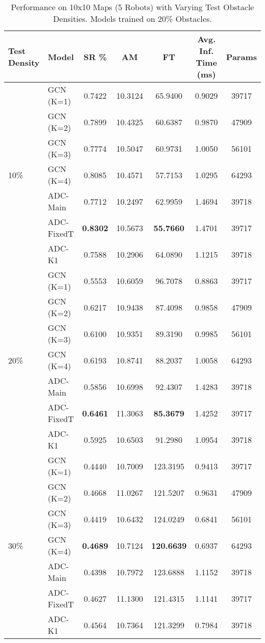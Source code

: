 \begin{table}[htbp]
    \centering
    \caption{Performance on 10x10 Maps (5 Robots) with Varying Test Obstacle Densities. Models trained on 20\% Obstacles.}
    \label{tab:density_perf_20D_train}
    \scriptsize %
    \begin{tabular}{llccccc}
        \toprule
        Test Density & Model & SR \% & AM & FT & Avg. Inf. Time (ms) & Params \\
        \midrule
        \multirow{7}{*}{10\%}
        & GCN (K=1) & 0.7422 & 10.3124 & 65.9400 & 0.9029 & 39717 \\
        & GCN (K=2) & 0.7899 & 10.4325 & 60.6387 & 0.9870 & 47909 \\
        & GCN (K=3) & 0.7774 & 10.5047 & 60.9731 & 1.0050 & 56101 \\
        & GCN (K=4) & 0.8085 & 10.4571 & 57.7153 & 1.0295 & 64293 \\
        & ADC-Main & 0.7712 & 10.2497 & 62.9959 & 1.4694 & 39718 \\
        & ADC-FixedT & \textbf{0.8302} & 10.5673 & \textbf{55.7660} & 1.4701 & 39717 \\
        & ADC-K1 & 0.7588 & 10.2906 & 64.0890 & 1.1215 & 39718 \\
        \midrule
        \multirow{7}{*}{20\%}
        & GCN (K=1) & 0.5553 & 10.6059 & 96.7078 & 0.8863 & 39717 \\
        & GCN (K=2) & 0.6217 & 10.9438 & 87.4098 & 0.9858 & 47909 \\
        & GCN (K=3) & 0.6100 & 10.9351 & 89.3190 & 0.9985 & 56101 \\
        & GCN (K=4) & 0.6193 & 10.8741 & 88.2037 & 1.0058 & 64293 \\
        & ADC-Main & 0.5856 & 10.6998 & 92.4307 & 1.4283 & 39718 \\
        & ADC-FixedT & \textbf{0.6461} & 11.3063 & \textbf{85.3679} & 1.4252 & 39717 \\ %
        & ADC-K1 & 0.5925 & 10.6503 & 91.2980 & 1.0954 & 39718 \\
        \midrule
        \multirow{7}{*}{30\%}
        & GCN (K=1) & 0.4440 & 10.7009 & 123.3195 & 0.9413 & 39717 \\
        & GCN (K=2) & 0.4668 & 11.0267 & 121.5207 & 0.9631 & 47909 \\
        & GCN (K=3) & 0.4419 & 10.6432 & 124.0249 & 0.6841 & 56101 \\
        & GCN (K=4) & \textbf{0.4689} & 10.7124 & \textbf{120.6639} & 0.6937 & 64293 \\
        & ADC-Main & 0.4398 & 10.7972 & 123.6888 & 1.1152 & 39718 \\
        & ADC-FixedT & 0.4627 & 11.1300 & 121.4315 & 1.1141 & 39717 \\
        & ADC-K1 & 0.4564 & 10.7364 & 121.3299 & 0.7984 & 39718 \\
        \bottomrule
    \end{tabular}
\end{table}
